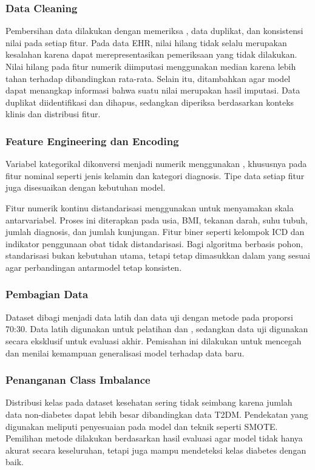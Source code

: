\subsubsection{Data Cleaning}
Pembersihan data dilakukan dengan memeriksa , data duplikat, dan konsistensi nilai pada setiap fitur. Pada data EHR, nilai hilang tidak selalu merupakan kesalahan karena dapat merepresentasikan pemeriksaan yang tidak dilakukan. Nilai hilang pada fitur numerik diimputasi menggunakan median karena lebih tahan terhadap  dibandingkan rata-rata. Selain itu, ditambahkan  agar model dapat menangkap informasi bahwa suatu nilai merupakan hasil imputasi. Data duplikat diidentifikasi dan dihapus, sedangkan  diperiksa berdasarkan konteks klinis dan distribusi fitur.

\subsubsection{Feature Engineering dan Encoding}
Variabel kategorikal dikonversi menjadi numerik menggunakan , khususnya pada fitur nominal seperti jenis kelamin dan kategori diagnosis. Tipe data setiap fitur juga disesuaikan dengan kebutuhan model.

Fitur numerik kontinu distandarisasi menggunakan  untuk menyamakan skala antarvariabel. Proses ini diterapkan pada usia, BMI, tekanan darah, suhu tubuh, jumlah diagnosis, dan jumlah kunjungan. Fitur biner seperti kelompok ICD dan indikator penggunaan obat tidak distandarisasi. Bagi algoritma berbasis pohon, standarisasi bukan kebutuhan utama, tetapi tetap dimasukkan dalam  yang sesuai agar perbandingan antarmodel tetap konsisten.

\subsubsection{Pembagian Data}
Dataset dibagi menjadi data latih dan data uji dengan metode  pada proporsi 70:30. Data latih digunakan untuk pelatihan dan , sedangkan data uji digunakan secara eksklusif untuk evaluasi akhir. Pemisahan ini dilakukan untuk mencegah  dan menilai kemampuan generalisasi model terhadap data baru.

\subsubsection{Penanganan Class Imbalance}
Distribusi kelas pada dataset kesehatan sering tidak seimbang karena jumlah data non-diabetes dapat lebih besar dibandingkan data T2DM. Pendekatan yang digunakan meliputi penyesuaian  pada model dan teknik  seperti SMOTE. Pemilihan metode dilakukan berdasarkan hasil evaluasi agar model tidak hanya akurat secara keseluruhan, tetapi juga mampu mendeteksi kelas diabetes dengan baik.

